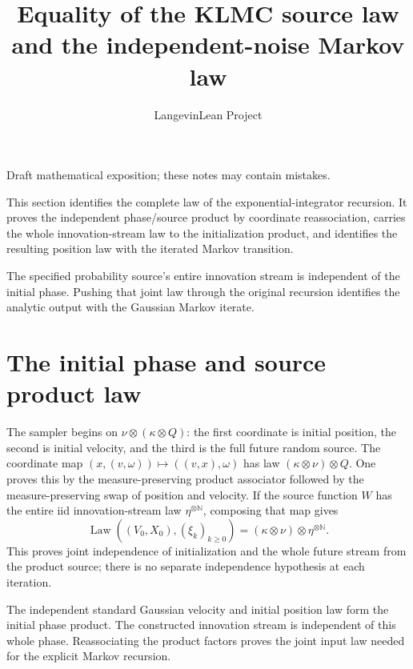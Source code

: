 \documentclass[11pt,a4paper]{article}
\title{\texorpdfstring{Equality of the KLMC source law and the independent-noise Markov law}{Equality of the KLMC source law and the independent-noise Markov law}}
\author{LangevinLean Project}
\date{}
\begin{document}
\maketitle
Draft mathematical exposition; these notes may contain mistakes.


This section identifies the complete law of the exponential-integrator recursion. It proves the independent phase/\allowbreak{}source product by coordinate reassociation, carries the whole innovation-stream law to the initialization product, and identifies the resulting position law with the iterated Markov transition.



The specified probability source’s entire innovation stream is independent of the initial phase. Pushing that joint law through the original recursion identifies the analytic output with the Gaussian Markov iterate.


\section{\texorpdfstring{The initial phase and source product law}{The initial phase and source product law}}


The sampler begins on \(\nu\otimes(\kappa\otimes Q)\): the first coordinate is initial position, the second is initial velocity, and the third is the full future random source. The coordinate map \((x,(v,\omega))\mapsto((v,x),\omega)\) has law \((\kappa\otimes\nu)\otimes Q\). One proves this by the measure-preserving product associator followed by the measure-preserving swap of position and velocity. If the source function \(W\) has the entire iid innovation-stream law \(\eta^{\otimes\mathbb N}\), composing that map gives \[\operatorname{Law}((V_0,X_0),(\xi_k)_{k\ge0})=(\kappa\otimes\nu)\otimes\eta^{\otimes\mathbb N}.\] This proves joint independence of initialization and the whole future stream from the product source; there is no separate independence hypothesis at each iteration.



The independent standard Gaussian velocity and initial position law form the initial phase product. The constructed innovation stream is independent of this whole phase. Reassociating the product factors proves the joint input law needed for the explicit Markov recursion.
\end{document}
